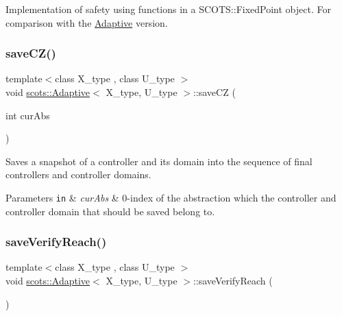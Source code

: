 Implementation of safety using functions in a S\+C\+O\+T\+S\+::\+Fixed\+Point object. For comparison with the \hyperlink{classscots_1_1Adaptive}{Adaptive} version. \mbox{\label{classscots_1_1Adaptive_ad3b8d9cf97cd0967409c14361a40d779}} 
\subsubsection{\texorpdfstring{save\+C\+Z()}{saveCZ()}}
{\footnotesize\ttfamily template$<$class X\+\_\+type , class U\+\_\+type $>$ \\
void \hyperlink{classscots_1_1Adaptive}{scots\+::\+Adaptive}$<$ X\+\_\+type, U\+\_\+type $>$\+::save\+CZ (\begin{DoxyParamCaption}\item[{int}]{cur\+Abs }\end{DoxyParamCaption})\hspace{0.3cm}{\ttfamily [inline]}}

Saves a snapshot of a controller and its domain into the sequence of final controllers and controller domains. 
\begin{DoxyParams}[1]{Parameters}
\mbox{\tt in}  & {\em cur\+Abs} & 0-\/index of the abstraction which the controller and controller domain that should be saved belong to. \\
\hline
\end{DoxyParams}
\mbox{\label{classscots_1_1Adaptive_aed48ef46c84bf6797bea16f896e44e3a}} 
\subsubsection{\texorpdfstring{save\+Verify\+Reach()}{saveVerifyReach()}}
{\footnotesize\ttfamily template$<$class X\+\_\+type , class U\+\_\+type $>$ \\
void \hyperlink{classscots_1_1Adaptive}{scots\+::\+Adaptive}$<$ X\+\_\+type, U\+\_\+type $>$\+::save\+Verify\+Reach (\begin{DoxyParamCaption}{ }\end{DoxyParamCaption})\hspace{0.3cm}{\ttfamily [inline]}}

